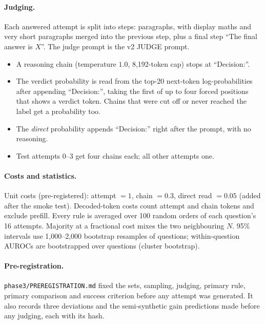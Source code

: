 \paragraph{Judging.}
Each answered attempt is split into steps: paragraphs, with display maths and very short paragraphs merged into the
previous step, plus a final step ``The final answer is $X$''. The judge prompt is the v2 JUDGE prompt.
\begin{itemize}
\item A reasoning chain (temperature $1.0$, 8,192-token cap) stops at ``Decision:''.
\item The verdict probability is read from the top-20 next-token log-probabilities after appending ``Decision:'',
  taking the first of up to four forced positions that shows a verdict token. Chains that were cut off or never
  reached the label get a probability too.
\item The \emph{direct} probability appends ``Decision:'' right after the prompt, with no reasoning.
\item Test attempts 0--3 get four chains each; all other attempts one.
\end{itemize}

\paragraph{Costs and statistics.}
Unit costs (pre-registered): attempt $=1$, chain $=0.3$, direct read $=0.05$ (added after the smoke test). Decoded-token
costs count attempt and chain tokens and exclude prefill. Every rule is averaged over 100 random orders of each
question's 16 attempts. Majority at a fractional cost mixes the two neighbouring $N$. 95\% intervals use 1,000--2,000
bootstrap resamples of questions; within-question AUROCs are bootstrapped over questions (cluster bootstrap).

\paragraph{Pre-registration.}
\texttt{phase3/PREREGISTRATION.md} fixed the sets, sampling, judging, primary rule, primary comparison and success
criterion before any attempt was generated. It also records three deviations and the semi-synthetic gain predictions
made before any judging, each with its hash.
